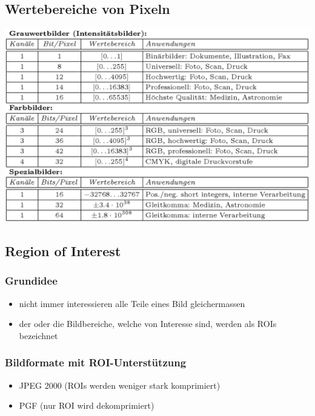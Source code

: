 \documentclass[10pt]{article}
\begin{document}
\subsection{Wertebereiche von Pixeln}
\begin{center}
	\includegraphics[scale=0.4]{pixel-wertebereiche.png} 
\end{center}

\subsection{Region of Interest}
\subsubsection*{Grundidee}
\begin{itemize}
	\item nicht immer interessieren alle Teile eines Bild gleichermassen
	\item der oder die Bildbereiche, welche von Interesse sind, werden als ROIs bezeichnet
\end{itemize}
\subsubsection*{Bildformate mit ROI-Unterstützung}
\begin{itemize}
	\item JPEG 2000 (ROIs werden weniger stark komprimiert)
	\item PGF (nur ROI wird dekomprimiert)
\end{itemize}
\end{document}
